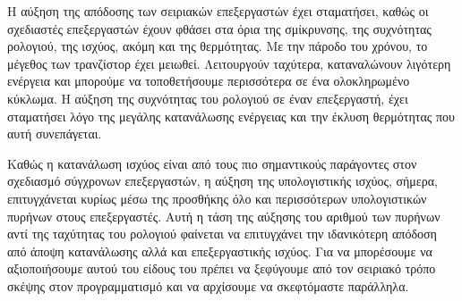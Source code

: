 Η αύξηση της απόδοσης των σειριακών επεξεργαστών έχει σταματήσει, καθώς οι σχεδιαστές επεξεργαστών έχουν φθάσει στα όρια της σμίκρυνσης, της συχνότητας ρολογιού, της ισχύος, ακόμη και της θερμότητας. 
Με την πάροδο του χρόνου, το μέγεθος των τρανζίστορ έχει μειωθεί. Λειτουργούν ταχύτερα, καταναλώνουν λιγότερη ενέργεια και μπορούμε να τοποθετήσουμε περισσότερα σε ένα ολοκληρωμένο κύκλωμα. 
Η αύξηση της συχνότητας του ρολογιού σε έναν επεξεργαστή, έχει σταματήσει λόγο της μεγάλης κατανάλωσης ενέργειας και την έκλυση θερμότητας που αυτή συνεπάγεται.
	
Καθώς η κατανάλωση ισχύος είναι από τους πιο σημαντικούς παράγοντες στον σχεδιασμό σύγχρονων επεξεργαστών, η αύξηση της υπολογιστικής ισχύος, σήμερα, επιτυγχάνεται κυρίως μέσω της προσθήκης όλο και περισσότερων υπολογιστικών πυρήνων στους επεξεργαστές. Αυτή η τάση της αύξησης του αριθμού των πυρήνων αντί της ταχύτητας του ρολογιού φαίνεται να επιτυγχάνει την ιδανικότερη απόδοση από άποψη κατανάλωσης αλλά και επεξεργαστικής ισχύος. 
Για να μπορέσουμε να αξιοποιήσουμε αυτού του είδους του  πρέπει να ξεφύγουμε από τον σειριακό τρόπο σκέψης στον προγραμματισμό και να αρχίσουμε να σκεφτόμαστε παράλληλα.



